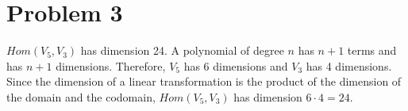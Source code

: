 \section{Problem 3}

$Hom(V_5, V_3)$ has dimension 24.
A polynomial of degree $n$ has $n+1$ terms and has $n+1$ dimensions.
Therefore, $V_5$ has 6 dimensions
and $V_3$ has 4 dimensions.
Since the dimension of a linear transformation is the
product of the dimension of the domain and the codomain,
$Hom(V_5, V_3)$ has dimension $6 \cdot 4 = 24$.